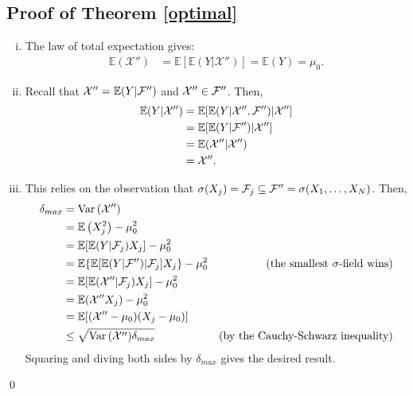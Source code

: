 \documentclass[11pt]{article}
\newcommand{\E}{\mathbb{E}}
\theoremstyle{definition}
\theoremstyle{definition}
\def\F{{\cal F}}
\def\E{{\mathbb E}}
\def\Var{{\rm Var}\,}
\begin{document}
\subsection{Proof of Theorem \ref{optimal}}
\begin{enumerate}[i)]
\item The law of total expectation gives:
\begin{align*}
\E(\mathcal{X}'') &= \E[\E(Y|\mathcal{X}'')] =  \E(Y) = \mu_0.
\end{align*}

\item Recall that $ \mathcal{X}'' = \E(Y | \F'')$ and $\mathcal{X}'' \in \F''$. Then,
\begin{align*}
\E(Y | \mathcal{X}'') &= \E[\E(Y|\mathcal{X}'',\F'')|\mathcal{X}'']\\
&= \E[\E(Y|\F'')|\mathcal{X}'']\\
&= \E(\mathcal{X}''|\mathcal{X}'') \\
&= \mathcal{X}''.
\end{align*}

\item This relies on the observation that $\sigma(X_j) = \F_j \subseteq \F'' = \sigma(X_1, \dots, X_N)$. Then,
\begin{align*}
\delta_{max} &=\Var(\mathcal{X}'')\\
 &= \E\left(X_j^2\right) - \mu_0^2\\
 &= \E[\E(Y|\F_j)X_j] - \mu_0^2\\
 &= \E\{\E[\E(Y|\F'')|\F_j]X_j\} - \mu_0^2 & \text{(the smallest $\sigma$-field wins)}\\
 &= \E[\E(\mathcal{X}''|\F_j)X_j] - \mu_0^2 \\
 &= \E(\mathcal{X}''X_j) - \mu_0^2 \\
 &= \E[(\mathcal{X}''-\mu_0)(X_j-\mu_0)]  \\
 &\leq \sqrt{\Var(\mathcal{X}'')\delta_{max} } & \text{(by the Cauchy-Schwarz inequality)} 
\end{align*}
Squaring and diving both sides by $\delta_{max} $ gives the desired result. 

\end{enumerate}
\qed
\end{document}
